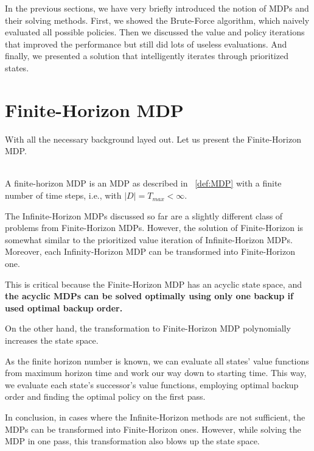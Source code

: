 In the previous sections, we have very briefly introduced the notion of MDPs and their solving methods. First, we showed the Brute-Force algorithm, which naively evaluated all possible policies. Then we discussed the value and policy iterations that improved the performance but still did lots of useless evaluations. And finally, we presented a solution that intelligently iterates through prioritized states. 

\section{Finite-Horizon MDP}

With all the necessary background layed out. Let us present the Finite-Horizon MDP.\\ \\

\begin{definition}
A finite-horizon MDP is an MDP as described in ~\ref{def:MDP} with a finite number of time steps, i.e., with $|D| = T_{max} < \infty$.
\end{definition}


The Infinite-Horizon MDPs discussed so far are a slightly different class of problems from Finite-Horizon MDPs. However, the solution of Finite-Horizon is somewhat similar to the prioritized value iteration of Infinite-Horizon MDPs. 
Moreover, each Infinity-Horizon MDP can be transformed into Finite-Horizon one.

This is critical because the Finite-Horizon MDP has an acyclic state space, and \textbf{the acyclic MDPs can be solved optimally using only one backup if used optimal backup order.} \cite{Kolobov2012}

On the other hand, the transformation to Finite-Horizon MDP polynomially increases the state space.

As the finite horizon number is known, we can evaluate all states' value functions from maximum horizon time and work our way down to starting time. This way, we evaluate each state's successor's value functions, employing optimal backup order and finding the optimal policy on the first pass.

In conclusion, in cases where the Infinite-Horizon methods are not sufficient, the MDPs can be transformed into Finite-Horizon ones. However, while solving the MDP in one pass, this transformation also blows up the state space.

